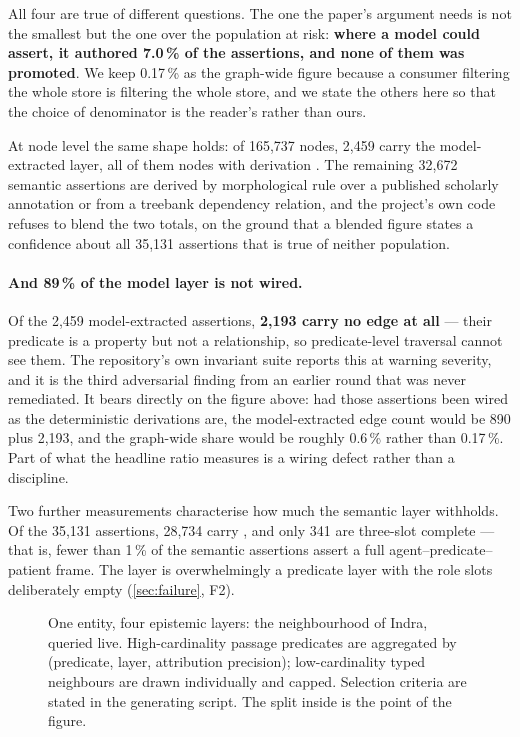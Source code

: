 All four are true of different questions. The one the paper's argument needs is not
the smallest but the one over the population at risk: \textbf{where a model could
assert, it authored 7.0\,\% of the assertions, and none of them was promoted}. We
keep 0.17\,\% as the graph-wide figure because a consumer filtering the whole store
is filtering the whole store, and we state the others here so that the choice of
denominator is the reader's rather than ours.

At node level the same shape holds: of 165{,}737 nodes, 2{,}459 carry the
model-extracted layer, all of them  nodes with derivation
. The remaining 32{,}672 semantic assertions are derived by
morphological rule over a published scholarly annotation or from a treebank
dependency relation, and the project's own code refuses to blend the two totals,
on the ground that a blended figure states a confidence about all 35{,}131
assertions that is true of neither population.

\paragraph{And 89\,\% of the model layer is not wired.} Of the 2{,}459
model-extracted assertions, \textbf{2{,}193 carry no 
edge at all} --- their predicate is a property but not a relationship, so
predicate-level traversal cannot see them. The repository's own invariant suite
reports this at warning severity, and it is the third adversarial finding from an
earlier round that was never remediated. It bears directly on the figure above: had
those assertions been wired as the deterministic derivations are, the
model-extracted edge count would be 890 plus 2{,}193, and the graph-wide share
would be roughly 0.6\,\% rather than 0.17\,\%. Part of what the headline ratio
measures is a wiring defect rather than a discipline.

Two further measurements characterise how much the semantic layer withholds. Of the
35{,}131 assertions, 28{,}734 carry , and only 341 are
three-slot complete --- that is, fewer than 1\,\% of the semantic assertions assert a
full agent--predicate--patient frame. The layer is overwhelmingly a predicate layer
with the role slots deliberately empty (\cref{sec:failure}, F2).

\begin{figure}[tbp]
\centering
\resizebox{0.95\textwidth}{!}{}
\caption{One entity, four epistemic layers: the neighbourhood of Indra, queried
live. High-cardinality passage predicates are aggregated by (predicate, layer,
attribution precision); low-cardinality typed neighbours are drawn individually and
capped. Selection criteria are stated in the generating script. The split inside
 is the point of the figure.}
\label{fig:indra}
\end{figure}

